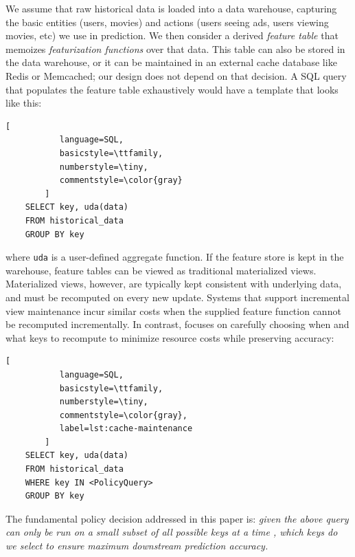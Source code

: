 We assume that raw historical data is loaded into a data warehouse, capturing the basic entities (users, movies) and actions (users seeing ads, users viewing movies, etc) we use in prediction. We then consider a derived \emph{feature table} that memoizes \emph{featurization functions} over that data. This table can also be stored in the data warehouse, or it can be maintained in an external cache database like Redis or Memcached; our design does not depend on that decision. A SQL query that populates the feature table exhaustively would have a template that looks like this:
\begin{lstlisting}[
           language=SQL,
           basicstyle=\ttfamily,
           numberstyle=\tiny,
           commentstyle=\color{gray}
        ]
    SELECT key, uda(data)
    FROM historical_data
    GROUP BY key
\end{lstlisting}
where \texttt{uda} is a user-defined aggregate function. If the feature store is kept in the warehouse, feature tables can be viewed as traditional materialized views. 
Materialized views, however, are typically kept consistent with underlying data, and must be recomputed on every new update. Systems that support incremental view maintenance incur similar costs when the supplied feature function cannot be recomputed incrementally. In contrast, \system{} focuses on carefully choosing when and what keys to recompute to minimize resource costs while preserving accuracy:
\begin{lstlisting}[
           language=SQL,
           basicstyle=\ttfamily,
           numberstyle=\tiny,
           commentstyle=\color{gray},
           label=lst:cache-maintenance
        ]
    SELECT key, uda(data)
    FROM historical_data
    WHERE key IN <PolicyQuery>
    GROUP BY key
\end{lstlisting}
The fundamental policy decision addressed in this paper is: \emph{given the above query can only be run on a small subset of all possible keys at a time ,
which keys do we select to ensure maximum downstream prediction accuracy. }
